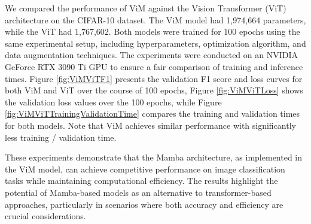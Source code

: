 \documentclass[conference]{IEEEtran}
\begin{document}
We compared the performance of ViM against the Vision Transformer (ViT) architecture \cite{dosovitskiy2021image} on the CIFAR-10 dataset. The ViM model had 1,974,664 parameters, while the ViT had 1,767,602.
Both models were trained for 100 epochs using the same experimental setup, including hyperparameters, optimization algorithm, and data augmentation techniques. The experiments were conducted on an NVIDIA GeForce RTX 3090 Ti GPU to ensure a fair comparison of training and inference times.
Figure \ref{fig:ViMViTF1} presents the validation F1 score and loss curves for both ViM and ViT over the course of 100 epochs, Figure \ref{fig:ViMViTLoss} shows the validation loss values over the 100 epochs, while Figure \ref{fig:ViMViTTrainingValidationTime} compares the training and validation times for both models. Note that ViM achieves similar performance with significantly less training / validation time.

These experiments demonstrate that the Mamba architecture, as implemented in the ViM model, can achieve competitive performance on image classification tasks while maintaining computational efficiency. The results highlight the potential of Mamba-based models as an alternative to transformer-based approaches, particularly in scenarios where both accuracy and efficiency are crucial considerations.
\end{document}
